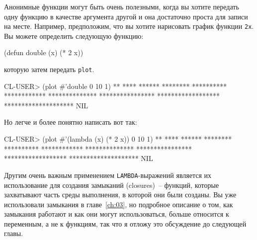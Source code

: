 Анонимные функции могут быть очень полезными, когда вы хотите передать одну функцию в
качестве аргумента другой и она достаточно проста для записи на месте.  Например,
предположим, что вы хотите нарисовать график функции \lstinline{2x}. Вы можете определить
следующую функцию:

\begin{myverb}
(defun double (x) (* 2 x))
\end{myverb}

\noindent{}которую затем передать \lstinline{plot}.

\begin{myverb}
CL-USER> (plot #'double 0 10 1)
**
****
******
********
**********
************
**************
****************
******************
********************
NIL
\end{myverb}

\vspace{1.7cm}

Но легче и более понятно написать вот так:

\begin{myverb}
CL-USER> (plot #'(lambda (x) (* 2 x)) 0 10 1)
**
****
******
********
**********
************
**************
****************
******************
********************
NIL
\end{myverb}

Другим очень важным применением \lstinline{LAMBDA}-выражений является их использование для
создания замыканий (closures)~-- функций, которые захватывают часть среды выполнения, в
которой они были созданы.  Вы уже использовали замыкания в главе~\ref{ch:03}, но подробное
описание о том, как замыкания работают и как они могут использоваться, больше относится к
переменным, а не к функциям, так что я отложу это обсуждение до следующей главы.

